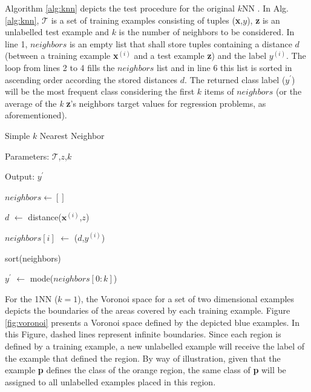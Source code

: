 Algorithm \ref{alg:knn} depicts the test procedure for the original $k$NN . In Alg. \ref{alg:knn}, $\mathcal{T}$ is a set of training examples consisting of tuples (\textbf{x},$y$), \textbf{z} is an unlabelled test example and $k$ is the number of neighbors to be considered. In line 1, $neighbors$ is an empty list that shall store tuples containing a distance $d$ (between a training example \textbf{x}$^{(i)}$ and a test example \textbf{z}) and the label $y^{(i)}$. The loop from lines 2 to 4 fills the $neighbors$ list and in line 6 this list is sorted in ascending order according the stored distances $d$. The returned class label ($y^{'}$) will be the most frequent class considering the first $k$ items of $neighbors$ (or the average of the \textit{k} \textbf{z}'s neighbors target values for regression problems, as aforementioned).

\vspace{0.2cm}

\begin{algorithm}[ht!]
    \caption{Simple $k$ Nearest Neighbor}
    
    Parameters: $\mathcal{T}$,$z$,$k$
    
    Output: $y^{'}$
    
    \begin{algorithmic}[1] 
    
    \STATE $neighbors \gets []$
    
    
      \STATE $d$ $\gets$ distance($\mathbf{x}^{(i)}$,$z$)
    
      
      \STATE $neighbors[i]$ $\gets$ ($d$,$y^{(i)}$)
    
    \ENDFOR
    
    
    \STATE sort(neighbors)
    
    
    \STATE $y^{'}$ $\gets$ mode($neighbors[0:k]$)
    
    
    \end{algorithmic}


\label{alg:knn}
    
\end{algorithm}


\vspace{0.2cm}

For the 1NN ($k = 1$), the Voronoi space for a set of two dimensional examples depicts the boundaries of the areas covered by each training example. Figure \ref{fig:voronoi} presents a Voronoi space defined by the depicted blue examples. In this Figure, dashed lines represent infinite boundaries. Since each region is defined by a training example, a new unlabelled example will receive the label of the example that defined the region. By way of illustration, given that the example \textbf{p} defines the class of the orange region, the same class of \textbf{p} will be assigned to all unlabelled examples placed in this region.


